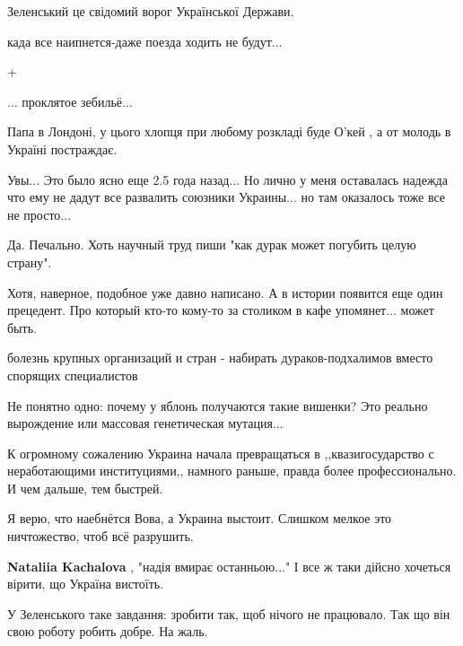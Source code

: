 \begin{itemize}
\begin{itemize}
\end{itemize} %

Зеленський це свідомий ворог Української Держави.

када все наипнется-даже поезда ходить не будут...

+

... проклятое зебильё...

Папа в Лондоні, у цього хлопця при любому розкладі буде О’кей , а от молодь в Україні постраждає.


Увы... Это было ясно еще 2.5 года назад... Но лично у меня оставалась надежда
что ему не дадут все развалить союзники Украины... но там оказалось тоже все не
просто...


Да. Печально. Хоть научный труд пиши "как дурак может погубить целую страну".

Хотя, наверное, подобное уже давно написано. А в истории появится еще один
прецедент. Про который кто-то кому-то за столиком в кафе упомянет... может
быть.

болезнь крупных организаций и стран - набирать дураков-подхалимов вместо спорящих специалистов

Не понятно одно: почему у яблонь получаются такие вишенки? Это реально вырождение или массовая генетическая мутация...


К огромному сожалению Украина начала превращаться в ,,квазигосударство с
неработающими институциями,, намного раньше, правда более профессионально. И
чем дальше, тем быстрей.



Я верю, что наебнётся Вова, а Украина выстоит. Слишком мелкое это ничтожество,
чтоб всё разрушить.

\begin{itemize} %
\textbf{Nataliia Kachalova} , "надія вмирає останньою..." І все ж таки дійсно хочеться вірити, що Україна вистоїть.
\end{itemize} %

У Зеленського таке завдання: зробити так, щоб нічого не працювало. Так що він
свою роботу робить добре. На жаль.


\end{itemize}

